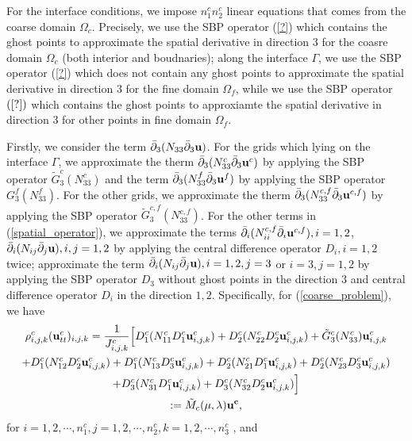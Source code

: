 \documentclass[a4paper]{article}
\begin{document}
For the interface conditions, we impose $n_1^cn_2^c$ linear equations that comes from the coarse domain $\Omega_c$. Precisely, we use the SBP operator (\ref{?}) which contains the ghost points to approximate the spatial derivative in direction $3$ for the coasre domain $\Omega_c$ (both interior and boudnaries); along the interface $\Gamma$, we use the SBP operator (\ref{?}) which does not contain any ghost points to approximate the spatial derivative in direction $3$ for the fine domain $\Omega_f$, while we use the SBP operator $(\ref{?})$ which contains the ghost points to approxiamte the spatial derivative in direction $3$ for other points in fine domain $\Omega_f$.

Firstly, we consider the term $\bar{\partial}_3(N_{33}\bar{\partial}_3{\bf u})$. For the grids which lying on the interface $\Gamma$, we approximate the therm $\bar{\partial}_3(N_{33}^{c}\bar{\partial}_3{\bf u}^{c})$ by applying the SBP operator $\tilde{G}^c_3(N_{33}^c)$ and the term $\bar{\partial}_3(N_{33}^{f}\bar{\partial}_3{\bf u}^{f})$ by applying the SBP operator $G^f_3(N_{33}^f)$. For the other grids, we approximate the therm $\bar{\partial}_3(N_{33}^{c,f}\bar{\partial}_3{\bf u}^{c,f})$ by applying the SBP operator $\tilde{G}^{c,f}_3(N_{33}^{c,f})$. For the other terms in (\ref{spatial_operator}), we approximate the terms $\bar{\partial}_i(N_{ii}^{c,f}\bar{\partial}_i{\bf u}^{c,f}), i = 1,2$, $\bar{\partial}_i(N_{ij}\bar{\partial}_j{\bf u}), i,j = 1,2$ by applying the central difference operator $D_i,i=1,2$ twice; approximate the term $\bar{\partial}_i(N_{ij}\bar{\partial}_j{\bf u}), i = 1,2,j = 3$ or $i = 3, j = 1,2$ by applying the SBP operator $D_3$ without ghost points in the direction $3$ and central difference operator $D_i$ in the direction $1,2$. Specifically, for (\ref{coarse_problem}), we have
\begin{multline}\label{coarse_scheme}
\rho_{i,j,k}^c ({\bf u}_{tt}^c)_{i,j,k} = \frac{1}{J_{i,j,k}^c}\Big[D_1^c(N_{11}^cD_1^c{\bf u}_{i,j,k}^c)+D_2^c(N_{22}^cD_2^c{\bf u}_{i,j,k}^c)+\tilde{G}_3^c(N_{33}^c){\bf u}_{i,j,k}^c\\
+D_1^c(N_{12}^cD_2^c{\bf u}_{i,j,k}^c)+D_1^c(N_{13}^cD_3^c{\bf u}_{i,j,k}^c)+D_2^c(N_{21}^cD_1^c{\bf u}_{i,j,k}^c)+D_2^c(N_{23}^cD_3^c{\bf u}_{i,j,k}^c)\\
+D_3^c(N_{31}^cD_1^c{\bf u}_{i,j,k}^c)+D_3^c(N_{32}^cD_2^c{\bf u}_{i,j,k}^c)\Big] \\
:= \tilde{M}_c(\mu,\lambda) \bf{u}^c,
\end{multline}
for $ i = 1,2,\cdots,n_1^c, j = 1,2,\cdots,n_2^c, k = 1,2,\cdots,n_3^c$ , and 
\end{document}
